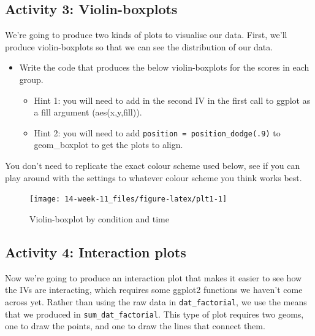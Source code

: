 \documentclass[]{book}
\providecommand{\tightlist}{%
  \setlength{\itemsep}{0pt}\setlength{\parskip}{0pt}}
\begin{document}
\hypertarget{activity-3-violin-boxplots}{%
\subsection{Activity 3: Violin-boxplots}\label{activity-3-violin-boxplots}}

We're going to produce two kinds of plots to visualise our data. First, we'll produce violin-boxplots so that we can see the distribution of our data.

\begin{itemize}
\tightlist
\item
  Write the code that produces the below violin-boxplots for the scores in each group.

  \begin{itemize}
  \tightlist
  \item
    Hint 1: you will need to add in the second IV in the first call to ggplot as a fill argument (aes(x,y,fill)).
  \item
    Hint 2: you will need to add \texttt{position\ =\ position\_dodge(.9)} to geom\_boxplot to get the plots to align.
  \end{itemize}
\end{itemize}

You don't need to replicate the exact colour scheme used below, see if you can play around with the settings to whatever colour scheme you think works best.

\begin{figure}

{\centering \texttt{[image: 14-week-11\_files/figure-latex/plt1-1]} 

}

\caption{Violin-boxplot by condition and time}\label{fig:plt1}
\end{figure}

\hypertarget{activity-4-interaction-plots}{%
\subsection{Activity 4: Interaction plots}\label{activity-4-interaction-plots}}

Now we're going to produce an interaction plot that makes it easier to see how the IVs are interacting, which requires some ggplot2 functions we haven't come across yet. Rather than using the raw data in \texttt{dat\_factorial}, we use the means that we produced in \texttt{sum\_dat\_factorial}. This type of plot requires two geoms, one to draw the points, and one to draw the lines that connect them.
\end{document}
